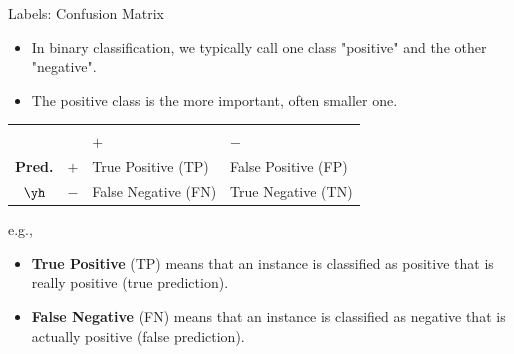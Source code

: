 \documentclass[11pt,compress,t,notes=noshow, xcolor=table]{beamer}
\begin{document}
\begin{vbframe}{Labels: Confusion Matrix}

\begin{itemize}
  \item In binary classification, we typically call one class "positive" and the 
  other "negative".
  \item The positive class is the more important, often smaller one.
\end{itemize}


\begin{center}
\small
\begin{tabular}{cc|>{\centering\arraybackslash}p{7em}>{\centering\arraybackslash}p{8em}}
    & & \multicolumn{2}{c}{\bfseries True Class $y$} \\
    & & $+$ & $-$ \\
    \hline
    \bfseries Pred.     & $+$ & True Positive (TP)  & False Positive (FP) \\
              $\yh$ & $-$ & False Negative (FN) & True Negative (TN) \\
\end{tabular}
\end{center}
e.g.,
\begin{itemize}
  \item \textbf{True Positive} (TP) means that an instance is classified as 
  positive that is really positive (true prediction).
  \item \textbf{False Negative} (FN) means that an instance is classified as 
  negative that is actually positive (false prediction). 
\end{itemize}

\end{vbframe}

\end{document}
